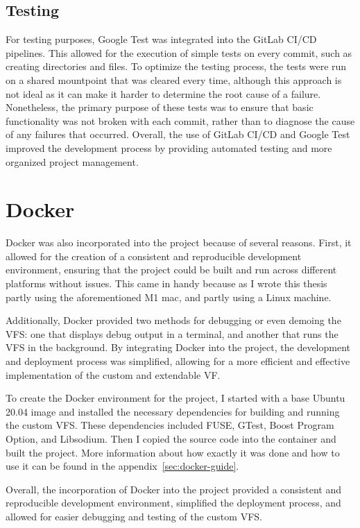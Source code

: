 \subsection{Testing}\label{subsec:testing}

For testing purposes, Google Test was integrated into the GitLab CI/CD pipelines.
This allowed for the execution of simple tests on every commit, such as creating directories and files.
To optimize the testing process, the tests were run on a shared mountpoint that was cleared every time, although this approach is not ideal as it can make it harder to determine the root cause of a failure.
Nonetheless, the primary purpose of these tests was to ensure that basic functionality was not broken with each commit, rather than to diagnose the cause of any failures that occurred.
Overall, the use of GitLab CI/CD and Google Test improved the development process by providing automated testing and more organized project management.


\section{Docker}\label{sec:docker}

Docker\cite{docker} was also incorporated into the project because of several reasons.
First, it allowed for the creation of a consistent and reproducible development environment, ensuring that the project could be built and run across different platforms without issues.
This came in handy because as I wrote this thesis partly using the aforementioned M1 mac, and partly using a Linux machine.

Additionally, Docker provided two methods for debugging or even demoing the VFS: one that displays debug output in a terminal, and another that runs the VFS in the background.
By integrating Docker into the project, the development and deployment process was simplified, allowing for a more efficient and effective implementation of the custom and extendable VF\@.

To create the Docker environment for the project, I started with a base Ubuntu 20.04 image and installed the necessary dependencies for building and running the custom VFS\@.
These dependencies included FUSE, GTest, Boost Program Option, and Libsodium.
Then I copied the source code into the container and built the project.
More information about how exactly it was done and how to use it can be found in the appendix~\ref{sec:docker-guide}.

Overall, the incorporation of Docker into the project provided a consistent and reproducible development environment, simplified the deployment process, and allowed for easier debugging and testing of the custom VFS.
